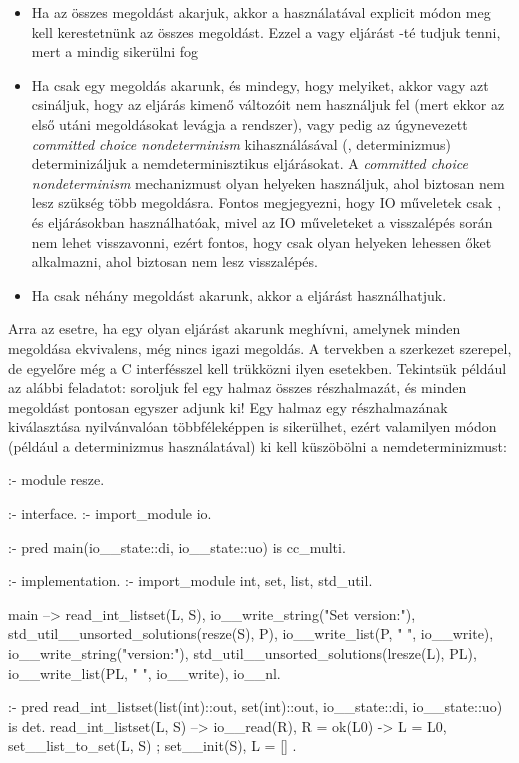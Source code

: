 \begin{itemize}
\item Ha az összes megoldást akarjuk, akkor a  használatával
explicit módon meg kell kerestetnünk az összes megoldást. Ezzel a  vagy
 eljárást -té tudjuk tenni, mert a  mindig
sikerülni fog
\item Ha csak egy megoldás akarunk, és mindegy, hogy melyiket, akkor vagy azt csináljuk,
hogy az eljárás kimenő változóit nem használjuk fel (mert ekkor az első utáni megoldásokat
levágja a rendszer), vagy pedig az úgynevezett \emph{committed choice nondeterminism}
kihasználásával (,  determinizmus) determinizáljuk a
nemdeterminisztikus eljárásokat. A \emph{committed choice nondeterminism} mechanizmust
olyan helyeken használjuk, ahol biztosan nem lesz szükség több megoldásra. Fontos
megjegyezni, hogy IO műveletek csak ,  és 
eljárásokban használhatóak, mivel az IO műveleteket a visszalépés során nem lehet
visszavonni, ezért fontos, hogy csak olyan helyeken lehessen őket alkalmazni, ahol
biztosan nem lesz visszalépés.
\item Ha csak néhány megoldást akarunk, akkor a  eljárást
használhatjuk.
\end{itemize}

Arra az esetre, ha egy olyan eljárást akarunk meghívni, amelynek minden megoldása
ekvivalens, még nincs igazi megoldás. A tervekben a  szerkezet
szerepel, de egyelőre még a C interfésszel kell trükközni ilyen esetekben.
\br
Tekintsük például az alábbi feladatot: soroljuk fel egy halmaz összes részhalmazát,
és minden megoldást pontosan egyszer adjunk ki! Egy halmaz egy részhalmazának
kiválasztása nyilvánvalóan többféleképpen is sikerülhet, ezért valamilyen módon
(például a  determinizmus használatával) ki kell küszöbölni a
nemdeterminizmust:

\begin{prologcode}
:- module resze.

:- interface.
:- import_module io.

:- pred main(io__state::di, io__state::uo) is cc_multi.

:- implementation.
:- import_module int, set, list, std_util.

main -->
         read_int_listset(L, S),
         io__write_string("Set version:\n"),
         {std_util__unsorted_solutions(resze(S), P)},
         io__write_list(P, " ", io__write),
         io__write_string("\n\nList version:\n"),
         {std_util__unsorted_solutions(lresze(L), PL)},
         io__write_list(PL, " ", io__write), io__nl.

:- pred read_int_listset(list(int)::out, set(int)::out,
                      io__state::di, io__state::uo) is det.
read_int_listset(L, S) -->
         io__read(R),
         {   R = ok(L0) -> L = L0, set__list_to_set(L, S)
         ;   set__init(S), L = []
         }.
\end{prologcode}

